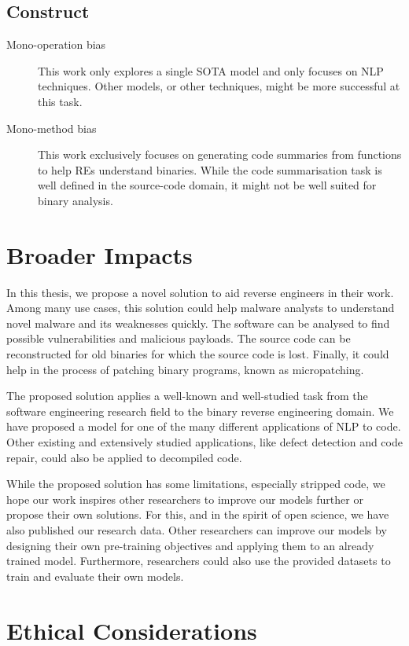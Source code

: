 \subsection{Construct}
    \begin{description}
        \item[Mono-operation bias] This work only explores a single SOTA model and only focuses on NLP techniques. Other models, or other techniques, might be more successful at this task.
        \item[Mono-method bias] This work exclusively focuses on generating code summaries from functions to help REs understand binaries. While the code summarisation task is well defined in the source-code domain, it might not be well suited for binary analysis.
    \end{description}


\section{Broader Impacts}
In this thesis, we propose a novel solution to aid reverse engineers in their work. Among many use cases, this solution could help malware analysts to understand novel malware and its weaknesses quickly. The software can be analysed to find possible vulnerabilities and malicious payloads. The source code can be reconstructed for old binaries for which the source code is lost. Finally, it could help in the process of patching binary programs, known as micropatching.

The proposed solution applies a well-known and well-studied task from the software engineering research field to the binary reverse engineering domain. We have proposed a model for one of the many different applications of NLP to code. Other existing and extensively studied applications, like defect detection and code repair, could also be applied to decompiled code. 

While the proposed solution has some limitations, especially stripped code, we hope our work inspires other researchers to improve our models further or propose their own solutions. For this, and in the spirit of open science, we have also published our research data. Other researchers can improve our models by designing their own pre-training objectives and applying them to an already trained model. Furthermore, researchers could also use the provided datasets to train and evaluate their own models.

\section{Ethical Considerations}
